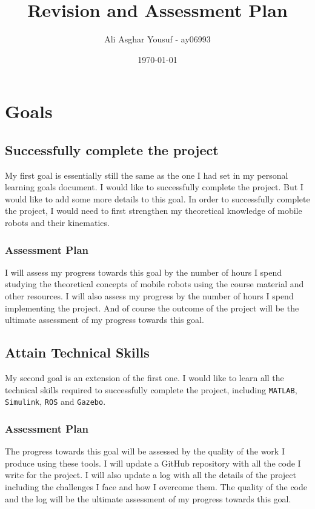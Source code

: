 \documentclass[12pt]{article}
\title{Revision and Assessment Plan}
\author{Ali Asghar Yousuf - ay06993}
\date{\today}
\begin{document}
\maketitle

\section*{Goals}
\subsection*{Successfully complete the project}
My first goal is essentially still the same as the one I had set in my personal
learning goals document. I would like to successfully complete the project. But
I would like to add some more details to this goal. In order to successfully
complete the project, I would need to first strengthen my theoretical knowledge
of mobile robots and their kinematics.

\subsubsection*{Assessment Plan}
I will assess my progress towards this goal by the number of hours I spend
studying the theoretical concepts of mobile robots using the course material
and other resources. I will also assess my progress by the number of hours I
spend implementing the project. And of course the outcome of the project will
be the ultimate assessment of my progress towards this goal.

\subsection*{Attain Technical Skills}
My second goal is an extension of the first one. I would like to learn all the
technical skills required to successfully complete the project, including
\texttt{MATLAB}, \texttt{Simulink}, \texttt{ROS} and \texttt{Gazebo}.

\subsubsection*{Assessment Plan}
The progress towards this goal will be assessed by the quality of the work I
produce using these tools. I will update a GitHub repository with all the code
I write for the project. I will also update a log with all the details of the
project including the challenges I face and how I overcome them. The quality of the code and the log will be the ultimate assessment
of my progress towards this goal.
\end{document}
